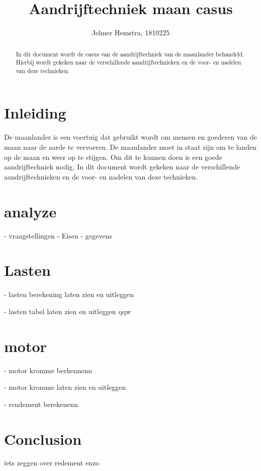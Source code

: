 \documentclass{article}
\title{Aandrijftechniek maan casus}
\author{Jelmer Hemstra, 1810225}
\begin{document}
    \maketitle

    \begin{abstract}
        In dit document wordt de casus van de aandrijftechniek van de maanlander behandeld. Hierbij wordt gekeken naar de verschillende aandrijftechnieken en de voor- en nadelen van deze technieken.

    \end{abstract}


\section{Inleiding}
    De maanlander is een voertuig dat gebruikt wordt om mensen en goederen van de maan naar de aarde te vervoeren. 
    De maanlander moet in staat zijn om te landen op de maan en weer op te stijgen. 
    Om dit te kunnen doen is een goede aandrijftechniek nodig. 
    In dit document wordt gekeken naar de verschillende aandrijftechnieken en de voor- en nadelen van deze technieken.

\section{analyze}
- vraagstellingen 
- Eisen
- gegevens



\section{Lasten}
- lasten berekening laten zien en uitleggen


- lasten tabel laten zien en uitleggen
qqw





\section{motor}
- motor kromme berkennenn

- motor kromme laten zien en uitleggen

- rendement berekenenn


\section{Conclusion}

iets zeggen over redement enzo
\end{document}
